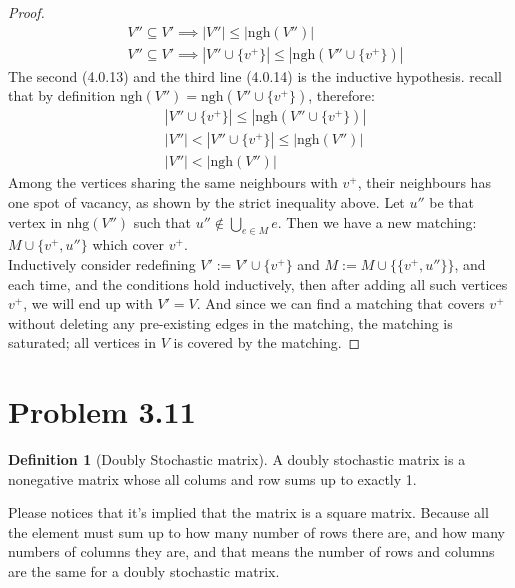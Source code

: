 \documentclass[]{article}
\theoremstyle{definition}
\newtheorem{definition}{Definition}
\begin{document}
\begin{proof}
\begin{align}
            & V''\subseteq V' \implies 
            |V''|\le |\text{ngh}(V'')|
            \\
            & V''\subseteq V' \implies 
            |V''\cup\{v^+\}|\le |\text{ngh}(V''\cup\{v^+\})|
        \end{align}
        The second (4.0.13) and the third line (4.0.14) is the inductive hypothesis. recall that by definition $\text{ngh}(V'') = \text{ngh}(V''\cup \{v^+\})$, therefore: 
        \begin{align}
            & |V''\cup\{v^+\}|\le |\text{ngh}(V''\cup\{v^+\})|
            \\
            & |V''| < |V''\cup\{v^+\}|\le |\text{ngh}(V'')|
            \\
            & |V''| < |\text{ngh}(V'')|
        \end{align}
        Among the vertices sharing the same neighbours with $v^+$, their neighbours has one spot of vacancy, as shown by the strict inequality above. Let $u''$ be that vertex in $\text{nhg}(V'')$ such that $u''\not\in \bigcup_{e\in M}e$. Then we have a new matching: $M\cup \{v^+, u''\}$ which cover $v^+$. 
        \\[1.1em]
        Inductively consider redefining $V':= V'\cup \{v^+\}$ and $M:= M\cup \{\{v^+,u''\}\}$, and each time, and the conditions hold inductively, then after adding all such vertices $v^+$, we will end up with $V' = V$. And since we can find a matching that covers $v^+$ without deleting any pre-existing edges in the matching, the matching is saturated; all vertices in $V$ is covered by the matching. 
    \end{proof}
\section{Problem 3.11}
    \begin{definition}[Doubly Stochastic matrix]
        A doubly stochastic matrix is a nonegative matrix whose all colums and row sums up to exactly 1. 
    \end{definition}
    Please notices that it's implied that the matrix is a square matrix. Because all the element must sum up to how many number of rows there are, and how many numbers of columns they are, and that means the number of rows and columns are the same for a doubly stochastic matrix. 
\end{document}
